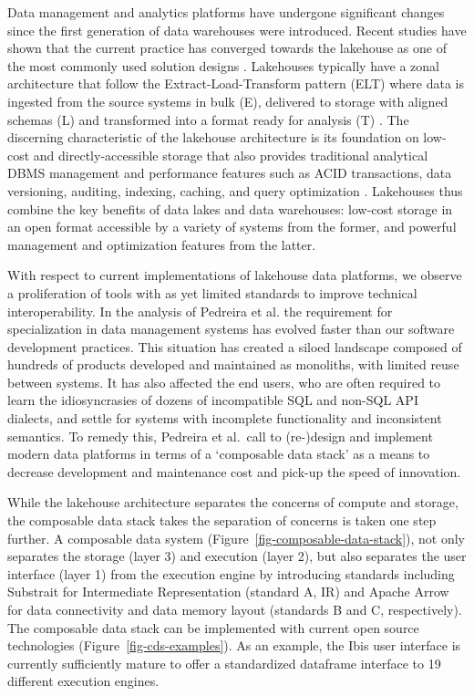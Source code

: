 \documentclass[
  authoryear]{elsarticle}
\begin{document}
Data management and analytics platforms have undergone significant
changes since the first generation of data warehouses were introduced.
Recent studies have shown that the current practice has converged
towards the lakehouse as one of the most commonly used solution designs
\citep{armbrust2021lakehouse, hai2023data, harby2022data}. Lakehouses
typically have a zonal architecture that follow the
Extract-Load-Transform pattern (ELT) where data is ingested from the
source systems in bulk (E), delivered to storage with aligned schemas
(L) and transformed into a format ready for analysis (T)
\citep{hai2023data}. The discerning characteristic of the lakehouse
architecture is its foundation on low-cost and directly-accessible
storage that also provides traditional analytical DBMS management and
performance features such as ACID transactions, data versioning,
auditing, indexing, caching, and query optimization
\citep{armbrust2021lakehouse}. Lakehouses thus combine the key benefits
of data lakes and data warehouses: low-cost storage in an open format
accessible by a variety of systems from the former, and powerful
management and optimization features from the latter.

With respect to current implementations of lakehouse data platforms, we
observe a proliferation of tools with as yet limited standards to
improve technical interoperability. In the analysis of Pedreira et al.
\citep{pedreira2023composable} the requirement for specialization in
data management systems has evolved faster than our software development
practices. This situation has created a siloed landscape composed of
hundreds of products developed and maintained as monoliths, with limited
reuse between systems. It has also affected the end users, who are often
required to learn the idiosyncrasies of dozens of incompatible SQL and
non-SQL API dialects, and settle for systems with incomplete
functionality and inconsistent semantics. To remedy this, Pedreira et
al.~call to (re-)design and implement modern data platforms in terms of
a `composable data stack' as a means to decrease development and
maintenance cost and pick-up the speed of innovation.

While the lakehouse architecture separates the concerns of compute and
storage, the composable data stack takes the separation of concerns is
taken one step further. A composable data system
(Figure~\ref{fig-composable-data-stack}), not only separates the storage
(layer 3) and execution (layer 2), but also separates the user interface
(layer 1) from the execution engine by introducing standards including
Substrait for Intermediate Representation (standard A, IR) and Apache
Arrow for data connectivity and data memory layout (standards B and C,
respectively). The composable data stack can be implemented with current
open source technologies (Figure~\ref{fig-cds-examples}). As an example,
the Ibis user interface is currently sufficiently mature to offer a
standardized dataframe interface to 19 different execution engines.
\end{document}
